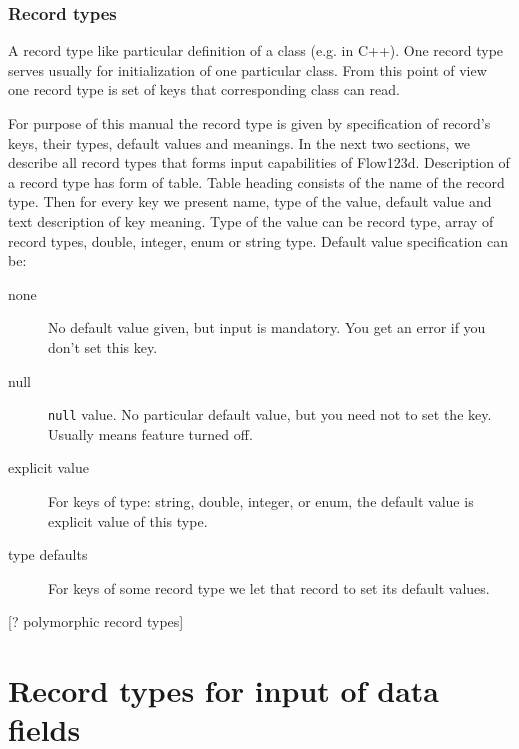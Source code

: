 \documentclass[12pt,a4paper]{report}
\begin{document}
\subsubsection{Record types}
A record type like particular definition of a class (e.g. in C++). One record type serves usually for initialization of 
one particular class. From this point of view one record type is set of keys that corresponding class can read.

For purpose of this manual the record type is given by specification of record's keys, their types, default values and meanings.
In the next two sections, we describe all record types that forms input capabilities of Flow123d. Description of a record type 
has form of table. Table heading consists of the name of the record type. Then for every key we present name, type of the value,
default value and text description of key meaning. Type of the value can be record type, array of record types, double, integer, enum or 
string type. Default value specification can be:
\begin{description} 
 \item[none] No default value given, but input is mandatory. You get an error if you don't set this key.
 \item[null] \verb'null' value. No particular default value, but you need not to set the key. Usually means feature turned off.
 \item[explicit value] For keys of type: string, double, integer, or enum, the default value is explicit value of this type.
 \item[type defaults] For keys of some record type we let that record to set its default values.
\end{description}

[? polymorphic record types]


\section{Record types for input of data fields}


\newenvironment{recordtype}[2]
{\par
 \vskip 2ex
 \noindent%
 record type: {\bf #1}#2
 \par%
 \vskip 0.5ex
 \hrule%
 \vskip 0.3ex
 \hrule
 \begingroup%
  \addtolength{\leftskip}{3em}%
  \gdef\keyitem##1##2##3{%
    \par
    \vskip 0.3ex
    \noindent%
    \hspace{-3em}{\bf\tt ##1} = {\it \textless ##2\textgreater} \hfill \makebox[0.4\textwidth][l]{DEFAULT: {##3}\hfil}%
    \par
  }%
}{%
  \vskip 0.7ex  
  \hrule%
  \vskip 0.5ex
  \endgroup%
}
\end{document}
